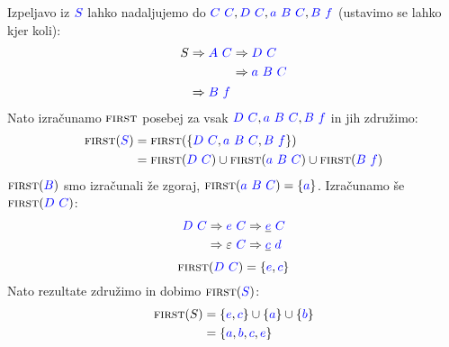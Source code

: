 \documentclass{article}
\newcommand{\FIRST}{\textsc{first}}
\newcommand{\Symbol}[1]{\textcolor{blue}{#1}}
\newcommand{\Null}{\varepsilon}
\newcommand{\Derive}{\Rightarrow}
\newcommand{\Seq}{\ }
\begin{document}
  Izpeljavo iz $\Symbol{S}$ lahko nadaljujemo do $\Symbol{C} \Seq \Symbol{C}, \Symbol{D} \Seq \Symbol{C}, \Symbol{a} \Seq \Symbol{B} \Seq \Symbol{C}, \Symbol{B} \Seq \Symbol{f}$ (ustavimo se lahko kjer koli):
  \begin{equation*}
    S \begin{aligned}[t]
      &\Derive \Symbol{A} \Seq \Symbol{C} \begin{aligned}[t]
        &\Derive \Symbol{D} \Seq \Symbol{C}\\
        &\Derive \Symbol{a} \Seq \Symbol{B} \Seq \Symbol{C}
      \end{aligned}\\
      &\Derive \Symbol{B} \Seq \Symbol{f}
    \end{aligned}
  \end{equation*}
  Nato izračunamo $\FIRST$ posebej za vsak $\Symbol{D} \Seq \Symbol{C}, \Symbol{a} \Seq \Symbol{B} \Seq \Symbol{C}, \Symbol{B} \Seq \Symbol{f}$ in jih združimo:
  \begin{align*}
    \FIRST(\Symbol{S}) &= \FIRST(\{\Symbol{D} \Seq \Symbol{C}, \Symbol{a} \Seq \Symbol{B} \Seq \Symbol{C}, \Symbol{B} \Seq \Symbol{f}\}) \\
              &= \FIRST(\Symbol{D} \Seq \Symbol{C}) \cup \FIRST(\Symbol{a} \Seq \Symbol{B} \Seq \Symbol{C}) \cup \FIRST(\Symbol{B} \Seq \Symbol{f})
  \end{align*}
  $\FIRST(\Symbol{B})$ smo izračunali že zgoraj, $\FIRST(\Symbol{a} \Seq \Symbol{B} \Seq \Symbol{C}) = \{\Symbol{a}\}$.
  Izračunamo še $\FIRST(\Symbol{D} \Seq \Symbol{C})$:
  \begin{equation*}
    \Symbol{D} \Seq \Symbol{C} \begin{aligned}[t]
      &\Derive \Symbol{e} \Seq \Symbol{C} \Derive \underline{\Symbol{e}} \Seq \Symbol{C} \\
      &\Derive \Null \Seq \Symbol{C} \Derive \underline{\Symbol{c}} \Seq \Symbol{d} \\
    \end{aligned}
  \end{equation*}
  \begin{equation*}
    \FIRST(\Symbol{D} \Seq \Symbol{C}) = \{\Symbol{e}, \Symbol{c}\}
  \end{equation*}
  Nato rezultate združimo in dobimo $\FIRST(\Symbol{S})$:
  \begin{align*}
    \FIRST(S) &= \{\Symbol{e}, \Symbol{c}\} \cup \{\Symbol{a}\} \cup \{\Symbol{b}\} \\
              &= \{\Symbol{a}, \Symbol{b}, \Symbol{c}, \Symbol{e}\}
  \end{align*}
\end{document}
